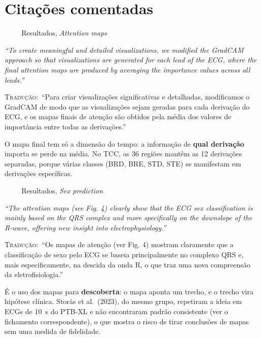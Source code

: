 \documentclass[11pt,a4paper]{article}
\newcommand{\pagechip}[1]{{\setlength{\fboxsep}{1.5pt}\colorbox{cAcc}{\textcolor{white}{\scriptsize\texttt{#1}}}}}
\newenvironment{origquote}{\par\itshape\small}{\par}
\newenvironment{tradquote}{\par\small\textsc{Tradução:}\ }{\par}
\newcommand{\explab}[1]{\par\smallskip{\small\color{cAcc}\textbf{\MakeUppercase{#1}}}\par}
\begin{document}
\section{Citações comentadas}

\begin{citacard}{\pagechip{p. 4} Resultados, \textit{Attention maps}}
\begin{origquote}“To create meaningful and detailed visualizations, we modified the GradCAM approach so that visualizations are generated for each lead of the ECG, where the final attention maps are produced by averaging the importance values across all leads.”\end{origquote}
\begin{tradquote}“Para criar visualizações significativas e detalhadas, modificamos o GradCAM de modo que as visualizações sejam geradas para cada derivação do ECG, e os mapas finais de atenção são obtidos pela média dos valores de importância entre todas as derivações.”\end{tradquote}
\explab{Explicação}
O mapa final tem só a dimensão do tempo: a informação de \textbf{qual derivação} importa se perde na média. No TCC, as 36 regiões mantêm as 12 derivações separadas, porque várias classes (BRD, BRE, STD, STE) se manifestam em derivações específicas.
\end{citacard}

\begin{citacard}{\pagechip{p. 4} Resultados, \textit{Sex prediction}}
\begin{origquote}“The attention maps (see Fig. 4) clearly show that the ECG sex classification is mainly based on the QRS complex and more specifically on the downslope of the R-wave, offering new insight into electrophysiology.”\end{origquote}
\begin{tradquote}“Os mapas de atenção (ver Fig. 4) mostram claramente que a classificação de sexo pelo ECG se baseia principalmente no complexo QRS e, mais especificamente, na descida da onda R, o que traz uma nova compreensão da eletrofisiologia.”\end{tradquote}
\explab{Explicação}
É o uso dos mapas para \textbf{descoberta}: o mapa aponta um trecho, e o trecho vira hipótese clínica. Storås et al.\ (2023), do mesmo grupo, repetiram a ideia em ECGs de 10~s do PTB-XL e não encontraram padrão consistente (ver o fichamento correspondente), o que mostra o risco de tirar conclusões de mapas sem uma medida de fidelidade.
\end{citacard}
\end{document}
